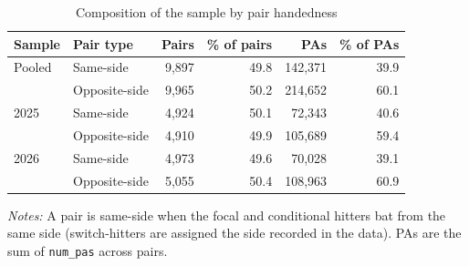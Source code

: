 \begin{table}[htbp]
\centering
\caption{Composition of the sample by pair handedness}
\label{tab:pair_side}
\begin{tabular}{llrrrr}
\hline\hline
Sample & Pair type & Pairs & \% of pairs & PAs & \% of PAs \\
\hline
Pooled & Same-side & 9,897 & 49.8 & 142,371 & 39.9 \\
 & Opposite-side & 9,965 & 50.2 & 214,652 & 60.1 \\
\hline
2025 & Same-side & 4,924 & 50.1 & 72,343 & 40.6 \\
 & Opposite-side & 4,910 & 49.9 & 105,689 & 59.4 \\
\hline
2026 & Same-side & 4,973 & 49.6 & 70,028 & 39.1 \\
 & Opposite-side & 5,055 & 50.4 & 108,963 & 60.9 \\
\hline\hline
\end{tabular}
\par\smallskip
\footnotesize
\textit{Notes:} A pair is same-side when the focal and conditional hitters bat from the same side (switch-hitters are assigned the side recorded in the data). PAs are the sum of \texttt{num\_pas} across pairs.
\end{table}

